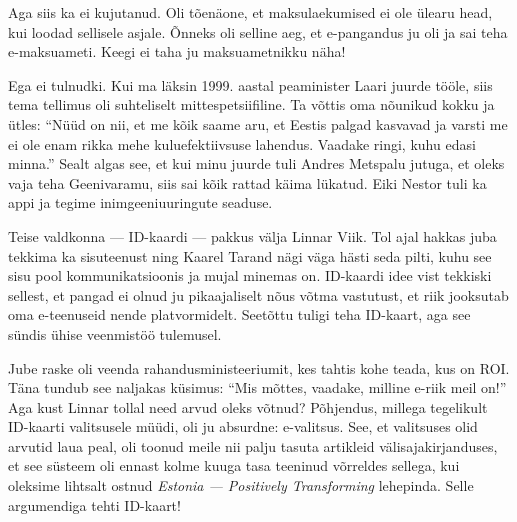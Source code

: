 Aga siis ka ei kujutanud. Oli tõenäone, et maksulaekumised ei ole ülearu head, 
kui loodad sellisele asjale. Õnneks oli selline aeg, et 
e-pangandus ju oli ja sai teha e-maksuameti. Keegi ei taha ju maksuametnikku näha! 


Ega ei tulnudki. Kui ma läksin 1999. aastal peaminister Laari juurde tööle, siis tema tellimus oli suhteliselt mittespetsiifiline. Ta võttis oma nõunikud kokku ja ütles: \enquote{Nüüd 
on nii, et me kõik saame aru, et Eestis palgad kasvavad ja varsti me ei 
ole enam rikka mehe kuluefektiivsuse lahendus. Vaadake ringi, kuhu edasi minna.} 
Sealt algas see, et kui minu juurde tuli Andres 
Metspalu jutuga, et oleks vaja teha 
Geenivaramu, siis sai kõik rattad käima lükatud. Eiki 
Nestor tuli ka appi ja tegime inimgeeniuuringute 
seaduse. 

Teise valdkonna --- ID-kaardi --- pakkus välja Linnar 
Viik. Tol ajal 
hakkas juba tekkima ka sisuteenust ning Kaarel Tarand nägi 
väga hästi seda pilti, kuhu see sisu pool kommunikatsioonis ja mujal
minemas on. ID-kaardi idee vist tekkiski sellest, et 
pangad ei olnud ju pikaajaliselt nõus võtma vastutust, et riik jooksutab oma 
e-teenuseid nende platvormidelt. Seetõttu tuligi teha ID-kaart, aga see 
sündis ühise veenmistöö tulemusel. 

Jube raske oli veenda rahandusministeeriumit, kes tahtis kohe 
teada, kus on ROI. Täna tundub see naljakas küsimus: \enquote{Mis 
mõttes, vaadake, milline e-riik meil on!} Aga kust Linnar tollal need arvud oleks võtnud? Põhjendus, 
millega tegelikult ID-kaarti valitsusele müüdi, oli ju absurdne: e-valitsus. See, et valitsuses olid 
arvutid laua peal, oli toonud meile nii palju tasuta artikleid 
välisajakirjanduses, et see süsteem oli ennast kolme kuuga tasa teeninud 
võrreldes sellega, kui oleksime lihtsalt ostnud \emph{Estonia --- Positively 
Transforming} lehepinda. Selle argumendiga 
tehti ID-kaart! 


